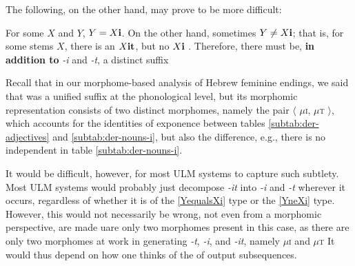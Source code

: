 The following, on the other hand, may prove to be more difficult:
\begin{exe} \label{ex:observations2}
\ex  For some $X$ and $Y$, $Y=X\text{\textbf{i}}$. \label{ex:YequalsXi} 
\ex  On the other hand, sometimes $Y \ne X\text{\textbf{i}}$; that is, for some stems 
$X$, there is an $X\text{\textbf{it}}$, but no $X\text{\textbf{i}}$ . \label{YneXi}
\ex Therefore, there must be, \textbf{in addition to} \textit{-i} and \textit{-t}, a distinct suffix 
\end{exe}
Recall that in our morphome-based analysis of Hebrew feminine endings, we said 
that  was a unified suffix at the phonological level, but its morphomic 
representation consists of two distinct morphomes, namely the pair 
$\langle$ $\mu$\textsc{i}, $\mu$\textsc{t} $\rangle$, which accounts
for the identities of exponence between tables \ref{subtab:der-adjectives} 
and \ref{subtab:der-nouns-i}, but also the difference, e.g., there is no independent
 in table \ref{subtab:der-nouns-i}.

It would be difficult, however, for most \ac{ULM}  systems to capture such subtlety. 
Most \ac{ULM}  systems would probably just decompose \textit{-it} 
into \textit{-i} and \textit{-t} wherever it occurs, regardless of whether it is of the
 \ref{YequalsXi} type or the \ref{YneXi} type. However, this would not necessarily be wrong, not
 even from a morphomic perspective, 
are made uare only two morphomes present in this case, 
 as there are only two morphomes at work in generating \textit{-t}, \textit{-i}, and \textit{-it}, 
 namely $\mu$\textsc{i} and $\mu$\textsc{t} 
It would thus depend on how one thinks of the of output subsequences. 

